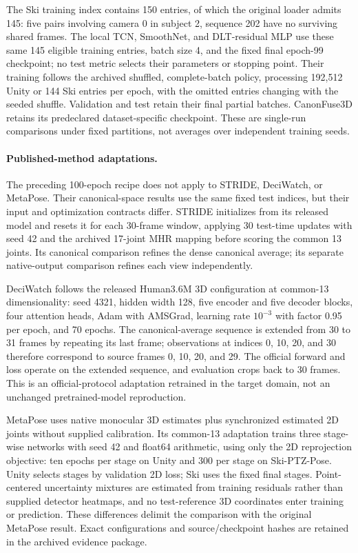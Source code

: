 \documentclass[11pt,letterpaper]{article}
\begin{document}
The Ski training index contains 150 entries, of which the original loader admits 145: five pairs involving camera 0 in subject 2, sequence 202 have no surviving shared frames. The local TCN, SmoothNet, and DLT-residual MLP use these same 145 eligible training entries, batch size 4, and the fixed final epoch-99 checkpoint; no test metric selects their parameters or stopping point. Their training follows the archived shuffled, complete-batch policy, processing 192,512 Unity or 144 Ski entries per epoch, with the omitted entries changing with the seeded shuffle. Validation and test retain their final partial batches. CanonFuse3D retains its predeclared dataset-specific checkpoint. These are single-run comparisons under fixed partitions, not averages over independent training seeds.

\paragraph{Published-method adaptations.}
The preceding 100-epoch recipe does not apply to STRIDE, DeciWatch, or MetaPose. Their canonical-space results use the same fixed test indices, but their input and optimization contracts differ. STRIDE initializes from its released model and resets it for each 30-frame window, applying 30 test-time updates with seed 42 and the archived 17-joint MHR mapping before scoring the common 13 joints. Its canonical comparison refines the dense canonical average; its separate native-output comparison refines each view independently.

DeciWatch follows the released Human3.6M 3D configuration at common-13 dimensionality: seed 4321, hidden width 128, five encoder and five decoder blocks, four attention heads, Adam with AMSGrad, learning rate $10^{-3}$ with factor 0.95 per epoch, and 70 epochs. The canonical-average sequence is extended from 30 to 31 frames by repeating its last frame; observations at indices 0, 10, 20, and 30 therefore correspond to source frames 0, 10, 20, and 29. The official forward and loss operate on the extended sequence, and evaluation crops back to 30 frames. This is an official-protocol adaptation retrained in the target domain, not an unchanged pretrained-model reproduction.

MetaPose uses native monocular 3D estimates plus synchronized estimated 2D joints without supplied calibration. Its common-13 adaptation trains three stage-wise networks with seed 42 and float64 arithmetic, using only the 2D reprojection objective: ten epochs per stage on Unity and 300 per stage on Ski-PTZ-Pose. Unity selects stages by validation 2D loss; Ski uses the fixed final stages. Point-centered uncertainty mixtures are estimated from training residuals rather than supplied detector heatmaps, and no test-reference 3D coordinates enter training or prediction. These differences delimit the comparison with the original MetaPose result. Exact configurations and source/checkpoint hashes are retained in the archived evidence package.
\end{document}
